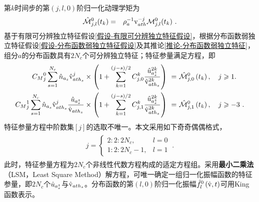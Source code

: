 第$k$时间步的第$(j,l,0)$阶归一化动理学矩为
  \begin{eqnarray}
      {\hat{\mathcal{M}}}{_{j,l}^0} (t_k) &=& \rho_a^{-1} \mathrm{v}_{ath}^{-j} {\mathcal{M}}{_{j,l}^0} (t_k) ~. \label{Mhjlk}
  \end{eqnarray}
基于有限可分辨独立特征假设\ref{假设-有限可分辨独立特征假设}，根据分布函数弱独立特征假设\ref{假设-分布函数弱独立特征假设}及其推论\ref{推论-分布函数弱独立特征}，组分$a$的分布函数具有$2N_c$个可分辨独立特征；特征参量满足方程，即
      \begin{eqnarray}
      \begin{aligned}
            {C_M}_j^0 \sum_{s=1}^{N_c} \hat{n}_{a_s} \hat{\mathrm{v}}_{{ath}_s}^j 
            \times  \left (1 + \sum_{k=1}^{(j-s)/2} C_{j,0}^k \frac{{\hat{u}}_{a_s^z}^{2k}}{\hat{\mathrm{v}}_{{ath}_s}^{2k}} \right) \ = \ & {\hat{\mathcal{M}}}{_{j,0}^0}\left(t_k \right), \quad j \geqslant 1 . \label{MhKj00sM2k}
            \\
            {C_M}_j^1 \sum_{s=1}^{N_c} \hat{n}_{a_s} \hat{\mathrm{v}}_{{ath}_s}^j \frac{ {\hat{u}}_{a_s^z}}{\hat{\mathrm{v}}_{{ath}_s}} 
            \times  \left (1 + \sum_{k=1}^{(j-s)/2} C_{j,1}^k \frac{{\hat{u}}_{a_s^z}^{2k}}{\hat{\mathrm{v}}_{{ath}_s}^{2k}} \right) \ = \ & {\hat{\mathcal{M}}}{_{j,1}^0}\left(t_k \right) , \quad j \geqslant -3 ~. \label{MhKj10sM2k}
      \end{aligned}
      \label{MhKjl0sM2k}
      \end{eqnarray}
特征参量方程中阶数集$[j]$的选取不唯一。本文采用如下奇奇偶偶格式，
\begin{align*}
\begin{split}
    j = \left \{
    \begin{array}{lr}
          2:2:2N_c,      & l=0 \\
          1:2:2N_c-1,    & l=1
    \end{array} ~.
\right.
\end{split}
\end{align*}
此时，特征参量方程为$2N_c$个非线性代数方程构成的适定方程组。采用\textbf{最小二乘法}（LSM，Least Square Method）解方程，可唯一确定一组归一化振幅函数的特征参量，即$2N_c$个${\hat{u}}_{a_s^z}$与$\hat{\mathrm{v}}_{{ath}_s}$。分布函数的第$(l,0)$阶归一化振幅$\hat{f}_l^0 \left(\hat{\mathrm{v}},t \right)$可用King函数表示。

